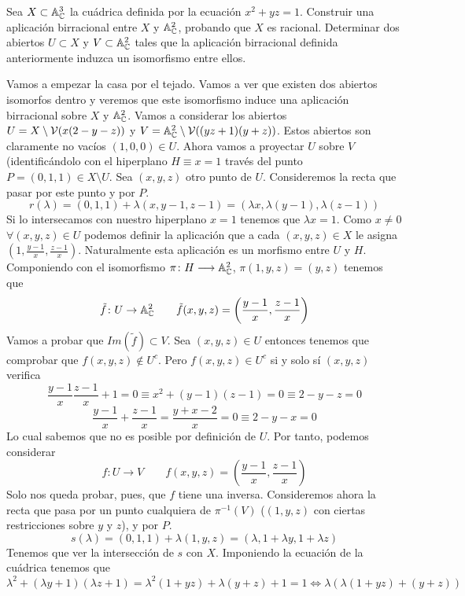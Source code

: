 \documentclass[twoside]{article}
\begin{document}
\newpage

\begin{ejercicio}{2} Sea $X\subset \mathbb{A}^3_{\mathbb{C}}$ la cuádrica definida por la ecuación $x^2 + yz =1$. Construir una aplicación birracional entre $X$ y $\mathbb{A}^2_{\mathbb{C}}$, probando que $X$ es racional. Determinar dos abiertos $U\subset X$ y $V\subset \mathbb{A}^2_{\mathbb{C}}$ tales que la aplicación birracional definida anteriormente induzca un isomorfismo entre ellos.
\end{ejercicio}
\begin{solucion}
Vamos a empezar la casa por el tejado. Vamos a ver que existen dos abiertos isomorfos dentro y veremos que este isomorfismo induce una aplicación birracional sobre $X$ y $\mathbb{A}^2_{\mathbb{C}}$. Vamos a considerar los abiertos $U=X\setminus\mathcal{V}(x(2-y-z))$ y $V=\mathbb{A}^2_{\mathbb{C}}\setminus \mathcal{V}((yz+1)(y+z))$. Estos abiertos son claramente no vacíos $(1,0,0)\in U$. Ahora vamos a proyectar $U$ sobre $V$ (identificándolo con el hiperplano $H\equiv x=1$ través del punto $P=(0,1,1)\in X\setminus U$. Sea $(x,y,z)$ otro punto de $U$. Consideremos la recta que pasar por este punto y por $P$.
$$
r(\lambda)= (0,1,1)+\lambda (x,y-1,z-1) = (\lambda x,\lambda (y-1),\lambda (z-1))
$$
Si lo intersecamos con nuestro hiperplano $x=1$ tenemos que $\lambda x= 1$. Como $x\neq 0$ $\forall (x,y,z)\in U$ podemos definir la aplicación que a cada $(x,y,z)\in X$ le asigna $(1,\frac{y-1}{x},\frac{z-1}{x})$. Naturalmente esta aplicación es un morfismo entre $U$ y $H$. Componiendo con el isomorfismo $\pi\colon{H}\longrightarrow{\mathbb{A}^2_{\mathbb{C}}}$, $\pi (1,y,z) = (y,z)$ tenemos que
$$
\tilde{f}\colon U\rightarrow \mathbb{A}_{\mathbb{C}}^2 \qquad \tilde{f}(x,y,z) =\left(\frac{y-1}{x},\frac{z-1}{x}\right)
$$
Vamos a probar que $Im(\tilde{f})\subset V$. Sea $(x,y,z)\in U$ entonces tenemos que comprobar que $f(x,y,z)\notin U^c$. Pero $f(x,y,z)\in U^c$ si y solo sí $(x,y,z)$ verifica
$$
\frac{y-1}{x}\frac{z-1}{x} + 1 = 0 \equiv x^2 + (y-1)(z-1) = 0 \equiv 2-y-z = 0
$$
$$
\frac{y-1}{x}+\frac{z-1}{x} = \frac{y+x-2}{x} = 0 \equiv 2-y-x = 0
$$
Lo cual sabemos que no es posible por definición de $U$. Por tanto, podemos considerar
$$
{f}\colon U\rightarrow V \qquad {f}(x,y,z) =\left(\frac{y-1}{x},\frac{z-1}{x}\right)
$$
Solo nos queda probar, pues, que $f$ tiene una inversa. Consideremos ahora la recta que pasa por un punto cualquiera de $\pi^{-1}(V)$ ($(1,y,z)$ con ciertas restricciones sobre $y$ y $z$), y por $P$. 
$$
s(\lambda) = (0,1,1)+\lambda(1,y,z)=(\lambda, 1+\lambda y, 1+ \lambda z)
$$
Tenemos que ver la intersección de $s$ con $X$. Imponiendo la ecuación de la cuádrica tenemos que
$$\lambda^2 + (\lambda y+1)(\lambda z + 1) = \lambda^2 (1+yz)+\lambda(y+z)+1 = 1 \Leftrightarrow \lambda(\lambda(1+yz)+(y+z))$$

\end{solucion}
\end{document}
